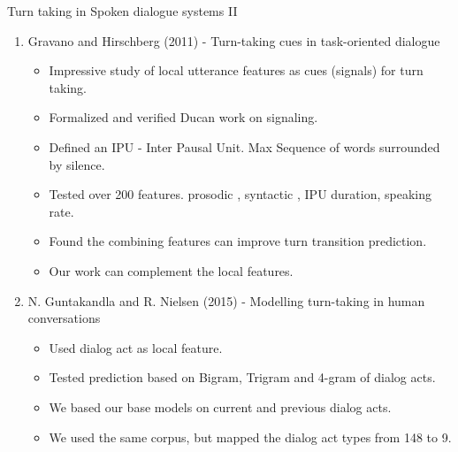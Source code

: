 \begin{frame} {Turn taking in Spoken dialogue systems II }
   \begin{enumerate}
      \item Gravano and Hirschberg (2011) - Turn-taking cues in task-oriented dialogue
         \begin{itemize}
            \item Impressive study of local utterance features as cues (signals) for turn taking.
            \item Formalized and verified Ducan work on signaling.
            \item Defined an IPU - Inter Pausal Unit. Max Sequence of words surrounded by silence.
            \item Tested over 200 features.  prosodic , syntactic , IPU duration, speaking rate.
            \item Found the combining features can improve turn transition prediction.
            \item Our work can complement the local features.
         \end{itemize}
        
         \item N. Guntakandla and R. Nielsen (2015) - Modelling turn-taking in human conversations
         \begin{itemize}
            \item Used dialog act as local feature.
            \item Tested prediction based on Bigram, Trigram and 4-gram of dialog acts.
            \item We based our base models on current and previous dialog acts.
            \item We used the same corpus, but mapped the dialog act types from 148 to 9.
         \end{itemize}
   \end{enumerate}
 \end{frame}

